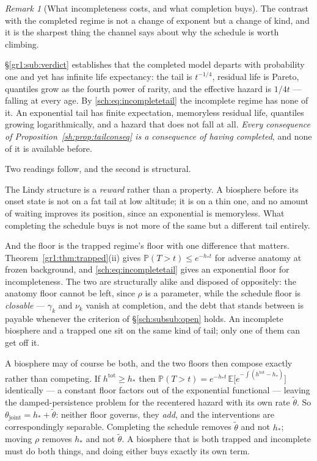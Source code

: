 \documentclass[11pt]{article}
\numberwithin{equation}{section}
\theoremstyle{plain}
\theoremstyle{definition}
\theoremstyle{remark}
\newtheorem{remark}[theorem]{Remark}
\newcommand{\E}{\mathbb{E}}
\newcommand{\PP}{\mathbb{P}}
\begin{document}
\begin{remark}[What incompleteness costs, and what completion buys]
\label{sch:rem:suspends}
The contrast with the completed regime is not a change of exponent but a
change of kind, and it is the sharpest thing the channel says about why
the schedule is worth climbing.

\S\ref{gr1:sub:verdict} establishes that the completed model departs with
probability one and yet has infinite life expectancy: the tail is
$t^{-1/4}$, residual life is Pareto, quantiles grow as the fourth power
of rarity, and the effective hazard is $1/4t$ --- falling at every age.
By \eqref{sch:eq:incompletetail} the incomplete regime has none of it.
An exponential tail has finite expectation, memoryless residual life,
quantiles growing logarithmically, and a hazard that does not fall at
all. \emph{Every consequence of Proposition~\ref{sh:prop:tailconseq} is a
consequence of having completed}, and none of it is available before.

Two readings follow, and the second is structural.

The Lindy structure is a \emph{reward} rather than a property. A
biosphere before its onset state is not on a fat tail at low altitude;
it is on a thin one, and no amount of waiting improves its position,
since an exponential is memoryless. What completing the schedule buys is
not more of the same but a different tail entirely.

And the floor is the trapped regime's floor with one difference that
matters. Theorem~\ref{gr1:thm:trapped}(ii) gives $\PP(T>t)\le e^{-h_\ast t}$
for adverse anatomy at frozen background, and \eqref{sch:eq:incompletetail}
gives an
exponential floor for incompleteness. The two are structurally alike and
disposed of oppositely: the anatomy floor cannot be left, since $\rho$ is
a parameter, while the schedule floor is \emph{closable} --- $\gamma_k$
and $\nu_k$ vanish at completion, and the debt that stands between is
payable whenever the criterion of \S\ref{sch:subsub:open} holds. An
incomplete biosphere and a trapped one sit on the same kind of tail; only
one of them can get off it.

A biosphere may of course be both, and the two floors then compose
exactly rather than competing. If $h^{\mathrm{tot}}\ge h_\ast$ then
$\PP(T>t)=e^{-h_\ast t}\,\E\bigl[e^{-\int(h^{\mathrm{tot}}-h_\ast)}\bigr]$
identically --- a constant floor factors out of the exponential
functional --- leaving the damped-persistence problem for the recentered
hazard with its own rate $\tilde\theta$. So
$\theta_{\mathrm{joint}}=h_\ast+\tilde\theta$: neither floor governs, they
\emph{add}, and the interventions are correspondingly separable.
Completing the schedule removes $\tilde\theta$ and not $h_\ast$; moving
$\rho$ removes $h_\ast$ and not $\tilde\theta$. A biosphere that is both
trapped and incomplete must do both things, and doing either buys exactly
its own term.
\end{remark}
\end{document}

